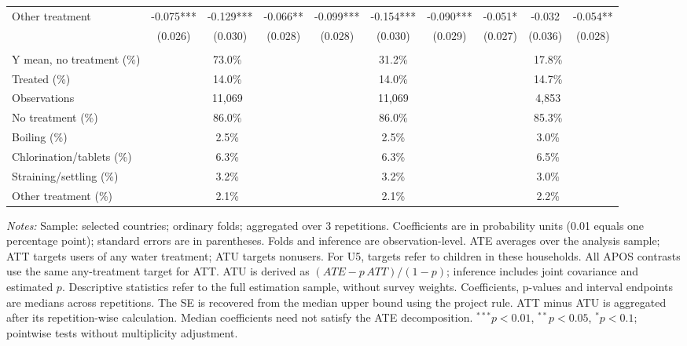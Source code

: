 \begin{table}[htbp]
\begin{adjustbox}{max width=\linewidth}
\begin{tabular}{lccccccccc}
Other treatment & -0.075*** & -0.129*** & -0.066** & -0.099*** & -0.154*** & -0.090*** & -0.051* & -0.032 & -0.054** \\
 & (0.026) & (0.030) & (0.028) & (0.028) & (0.030) & (0.029) & (0.027) & (0.036) & (0.028) \\
\addlinespace[6pt]
\multicolumn{10}{l}{\textit{Descriptive statistics and sample}} \\
Y mean, no treatment (\%) & \multicolumn{3}{c}{73.0\%} & \multicolumn{3}{c}{31.2\%} & \multicolumn{3}{c}{17.8\%} \\
Treated (\%) & \multicolumn{3}{c}{14.0\%} & \multicolumn{3}{c}{14.0\%} & \multicolumn{3}{c}{14.7\%} \\
Observations & \multicolumn{3}{c}{11,069} & \multicolumn{3}{c}{11,069} & \multicolumn{3}{c}{4,853} \\
No treatment (\%) & \multicolumn{3}{c}{86.0\%} & \multicolumn{3}{c}{86.0\%} & \multicolumn{3}{c}{85.3\%} \\
Boiling (\%) & \multicolumn{3}{c}{2.5\%} & \multicolumn{3}{c}{2.5\%} & \multicolumn{3}{c}{3.0\%} \\
Chlorination/tablets (\%) & \multicolumn{3}{c}{6.3\%} & \multicolumn{3}{c}{6.3\%} & \multicolumn{3}{c}{6.5\%} \\
Straining/settling (\%) & \multicolumn{3}{c}{3.2\%} & \multicolumn{3}{c}{3.2\%} & \multicolumn{3}{c}{3.0\%} \\
Other treatment (\%) & \multicolumn{3}{c}{2.1\%} & \multicolumn{3}{c}{2.1\%} & \multicolumn{3}{c}{2.2\%} \\
\hline\hline
\end{tabular}
\end{adjustbox}
\par\vspace{3pt}
\begin{minipage}{\linewidth}\scriptsize \textit{Notes:} Sample: selected countries; ordinary folds; aggregated over 3 repetitions. Coefficients are in probability units (0.01 equals one percentage point); standard errors are in parentheses. Folds and inference are observation-level. ATE averages over the analysis sample; ATT targets users of any water treatment; ATU targets nonusers. For U5, targets refer to children in these households. All APOS contrasts use the same any-treatment target for ATT. ATU is derived as $(ATE-p\,ATT)/(1-p)$; inference includes joint covariance and estimated $p$. Descriptive statistics refer to the full estimation sample, without survey weights. Coefficients, p-values and interval endpoints are medians across repetitions. The SE is recovered from the median upper bound using the project rule. ATT minus ATU is aggregated after its repetition-wise calculation. Median coefficients need not satisfy the ATE decomposition. $^{***}p<0.01$, $^{**}p<0.05$, $^{*}p<0.1$; pointwise tests without multiplicity adjustment.\end{minipage}
\end{table}
